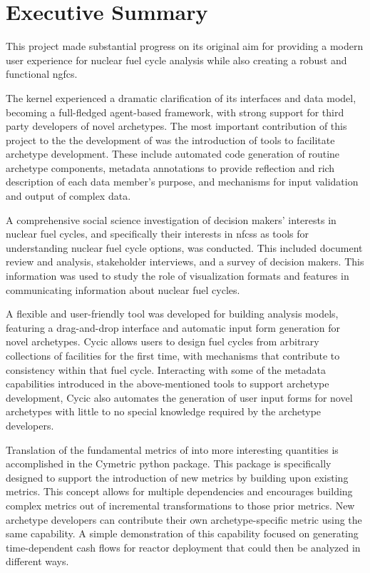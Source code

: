 \section*{Executive Summary}

This project made substantial progress on its original aim for providing a
modern user experience for nuclear fuel cycle analysis while also creating a
robust and functional \acrlong{ngfcs}.

The \Cyclus kernel experienced a dramatic clarification of its interfaces and
data model, becoming a full-fledged agent-based framework, with strong support
for third party developers of novel archetypes.  The most important
contribution of this project to the the development of \Cyclus was the
introduction of tools to facilitate archetype development.  These include
automated code generation of routine archetype components, metadata
annotations to provide reflection and rich description of each data member's
purpose, and mechanisms for input validation and output of complex data.

A comprehensive social science investigation of decision makers' interests in
nuclear fuel cycles, and specifically their interests in \glspl{nfcs} as tools
for understanding nuclear fuel cycle options, was conducted.  This included
document review and analysis, stakeholder interviews, and a survey of decision
makers.  This information was used to study the role of visualization formats
and features in communicating information about nuclear fuel cycles.

A flexible and user-friendly tool was developed for building \Cyclus analysis
models, featuring a drag-and-drop interface and automatic input form
generation for novel archetypes.  Cycic allows users to design fuel cycles
from arbitrary collections of facilities for the first time, with mechanisms
that contribute to consistency within that fuel cycle.  Interacting with some
of the metadata capabilities introduced in the above-mentioned tools to
support archetype development, Cycic also automates the generation of user
input forms for novel archetypes with little to no special knowledge required
by the archetype developers.

Translation of the fundamental metrics of \Cyclus into more interesting
quantities is accomplished in the Cymetric python package.  This package is
specifically designed to support the introduction of new metrics by building
upon existing metrics.  This concept allows for multiple dependencies and
encourages building complex metrics out of incremental transformations to
those prior metrics.  New archetype developers can contribute their own
archetype-specific metric using the same capability.  A simple demonstration
of this capability focused on generating time-dependent cash flows for reactor
deployment that could then be analyzed in different ways.

